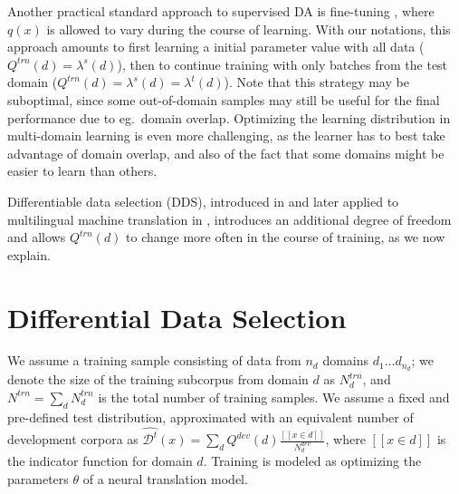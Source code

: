 \documentclass[11pt,a4paper]{article}
\newcommand{\fyTodo}[1]{\Todo[FY:]{\textcolor{orange}{#1}}}
\begin{document}
Another practical standard approach to supervised DA is fine-tuning \cite{Luong15stanford,Freitag16fast}, where $q(x)$ is allowed to vary during the course of learning. With our notations, this approach amounts to first learning a initial parameter value with all data ($Q^{trn}(d) = \lambda^{s}(d)$), then to continue training with only batches from the test domain ($Q^{trn}(d) = \lambda^{s}(d) = \lambda^{t}(d)$). Note that this strategy may be suboptimal, since some out-of-domain samples may still be useful for the final performance due to eg.\ domain overlap. Optimizing the learning distribution in multi-domain learning is even more challenging, as the learner has to best take advantage of domain overlap, and also of the fact that some domains might be easier to learn than others.\fyTodo{How to measure this?} 

Differentiable data selection (DDS), introduced in \cite{Wang20optimizing} and later applied to multilingual machine translation in \cite{Wang20balancing}, introduces an additional degree of freedom and allows $Q^{trn}(d)$ to change more often in the course of training, as we now explain.


\section{Differential Data Selection} \label{sec:dds}
We assume a training sample consisting of data from $n_d$ domains $d_1 \dots d_{n_d}$; we denote the size of the training subcorpus from domain $d$ as  $N^{trn}_d$, and $N^{trn} = \sum_d N^{trn}_d$ is the total number of training samples. We assume a fixed and pre-defined test distribution, approximated with an equivalent number of development corpora as $\widehat{\mathcal{D}^t}(x) = \sum_{d} Q^{dev}(d) \frac{[[x \in d]]}{N^{dev}_d}$, where $[[x \in d]]$ is the indicator function for domain $d$. Training is modeled as optimizing the parameters $\theta$ of a neural translation model.
\end{document}

